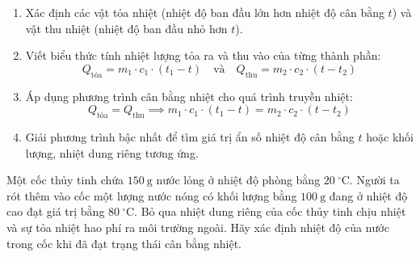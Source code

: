 \begin{phuongphap}
\begin{enumerate}
\item Xác định các vật tỏa nhiệt (nhiệt độ ban đầu lớn hơn nhiệt độ cân bằng $t$) và vật thu nhiệt (nhiệt độ ban đầu nhỏ hơn $t$).
\item Viết biểu thức tính nhiệt lượng tỏa ra và thu vào của từng thành phần:
\[
Q_{\text{tỏa}} = m_1 \cdot c_1 \cdot (t_1 - t) \quad \text{và} \quad Q_{\text{thu}} = m_2 \cdot c_2 \cdot (t - t_2)
\]
\item Áp dụng phương trình cân bằng nhiệt cho quá trình truyền nhiệt:
\[
Q_{\text{tỏa}} = Q_{\text{thu}} \implies m_1 \cdot c_1 \cdot (t_1 - t) = m_2 \cdot c_2 \cdot (t - t_2)
\]
\item Giải phương trình bậc nhất để tìm giá trị ẩn số nhiệt độ cân bằng $t$ hoặc khối lượng, nhiệt dung riêng tương ứng.
\end{enumerate}
\end{phuongphap}
\begin{vidumau}
Một cốc thủy tinh chứa $150\ \mathrm{g}$ nước lỏng ở nhiệt độ phòng bằng $20\ ^\circ\mathrm{C}$. Người ta rót thêm vào cốc một lượng nước nóng có khối lượng bằng $100\ \mathrm{g}$ đang ở nhiệt độ cao đạt giá trị bằng $80\ ^\circ\mathrm{C}$. Bỏ qua nhiệt dung riêng của cốc thủy tinh chịu nhiệt và sự tỏa nhiệt hao phí ra môi trường ngoài. Hãy xác định nhiệt độ của nước trong cốc khi đã đạt trạng thái cân bằng nhiệt.
\end{vidumau}

